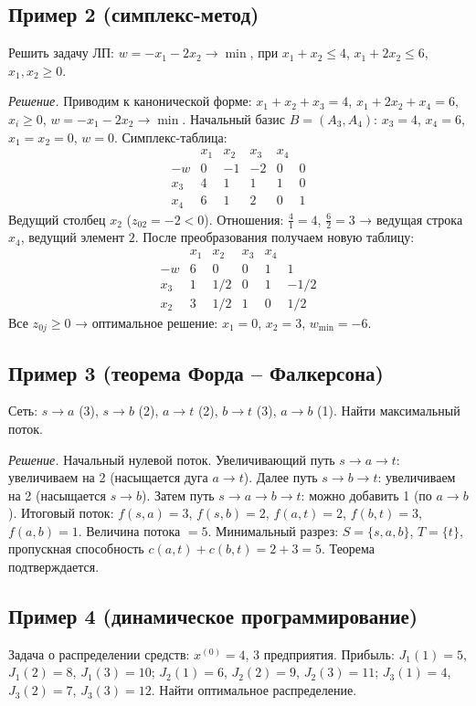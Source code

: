\documentclass{article}
\theoremstyle{plain}
\begin{document}
\subsection*{Пример 2 (симплекс-метод)}
Решить задачу ЛП: $w=-x_1-2x_2\to\min$, при $x_1+x_2\le 4$, $x_1+2x_2\le 6$, $x_1,x_2\ge0$.

\textit{Решение.} Приводим к канонической форме: $x_1+x_2+x_3=4$, $x_1+2x_2+x_4=6$, $x_i\ge0$, $w=-x_1-2x_2\to\min$. Начальный базис $B=(A_3,A_4)$: $x_3=4$, $x_4=6$, $x_1=x_2=0$, $w=0$. Симплекс-таблица:
\[
\begin{array}{c|cccc|c}
 & x_1 & x_2 & x_3 & x_4 & \\ \hline
-w & 0 & -1 & -2 & 0 & 0 \\
x_3 & 4 & 1 & 1 & 1 & 0 \\
x_4 & 6 & 1 & 2 & 0 & 1
\end{array}
\]
Ведущий столбец $x_2$ ($z_{02}=-2<0$). Отношения: $\frac{4}{1}=4$, $\frac{6}{2}=3$ → ведущая строка $x_4$, ведущий элемент $2$. После преобразования получаем новую таблицу:
\[
\begin{array}{c|cccc|c}
 & x_1 & x_2 & x_3 & x_4 & \\ \hline
-w & 6 & 0 & 0 & 1 & 1 \\
x_3 & 1 & 1/2 & 0 & 1 & -1/2 \\
x_2 & 3 & 1/2 & 1 & 0 & 1/2
\end{array}
\]
Все $z_{0j}\ge0$ → оптимальное решение: $x_1=0$, $x_2=3$, $w_{\min}=-6$.

\subsection*{Пример 3 (теорема Форда – Фалкерсона)}
Сеть: $s\to a$ (3), $s\to b$ (2), $a\to t$ (2), $b\to t$ (3), $a\to b$ (1). Найти максимальный поток.

\textit{Решение.} Начальный нулевой поток. Увеличивающий путь $s\to a\to t$: увеличиваем на 2 (насыщается дуга $a\to t$). Далее путь $s\to b\to t$: увеличиваем на 2 (насыщается $s\to b$). Затем путь $s\to a\to b\to t$: можно добавить 1 (по $a\to b$). Итоговый поток: $f(s,a)=3$, $f(s,b)=2$, $f(a,t)=2$, $f(b,t)=3$, $f(a,b)=1$. Величина потока $=5$. Минимальный разрез: $S=\{s,a,b\}$, $T=\{t\}$, пропускная способность $c(a,t)+c(b,t)=2+3=5$. Теорема подтверждается.

\subsection*{Пример 4 (динамическое программирование)}
Задача о распределении средств: $x^{(0)}=4$, 3 предприятия. Прибыль: $J_1(1)=5$, $J_1(2)=8$, $J_1(3)=10$; $J_2(1)=6$, $J_2(2)=9$, $J_2(3)=11$; $J_3(1)=4$, $J_3(2)=7$, $J_3(3)=12$. Найти оптимальное распределение.
\end{document}
